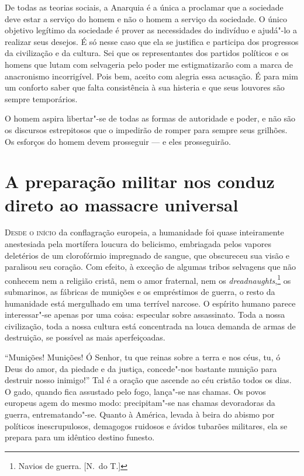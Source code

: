De todas as teorias sociais, a Anarquia é a única a proclamar que a
sociedade deve estar a serviço do homem e não o homem a serviço da
sociedade. O único objetivo legítimo da sociedade é prover as
necessidades do indivíduo e ajudá"-lo a realizar seus desejos. É só
nesse caso que ela se justifica e participa dos progressos da
civilização e da cultura. Sei que os representantes dos partidos
políticos e os homens que lutam com selvageria pelo poder me
estigmatizarão com a marca de anacronismo incorrigível. Pois bem,
aceito com alegria essa acusação. É para mim um conforto saber que
falta consistência à sua histeria e que seus louvores são sempre
temporários.

O homem aspira libertar"-se de todas as formas de autoridade e poder,
e não são os discursos estrepitosos que o impedirão de romper para
sempre seus grilhões. Os esforços do homem devem prosseguir --- e eles
prosseguirão.

\chapter{A preparação militar nos conduz direto ao massacre universal}


\textsc{Desde o início} da conflagração europeia, a humanidade foi quase
inteiramente anestesiada pela mortífera loucura do belicismo,
embriagada pelos vapores deletérios de um clorofórmio impregnado de
sangue, que obscureceu sua visão e paralisou seu coração. Com efeito, à
exceção de algumas tribos selvagens que não conhecem nem a religião
cristã, nem o amor fraternal, nem os \textit{dreadnaughts},\footnote{ 
Navios de guerra. [N.~do T.]}
os submarinos, as fábricas de munições e os empréstimos
de guerra, o resto da humanidade está mergulhado em uma terrível
narcose. O espírito humano parece interessar"-se apenas por uma coisa:
especular sobre assassinato. Toda a nossa civilização, toda a nossa
cultura está concentrada na louca demanda de armas de destruição, se
possível as mais aperfeiçoadas.

“Munições! Munições! Ó Senhor, tu que reinas sobre a terra e nos céus,
tu, ó Deus do amor, da piedade e da justiça, concede"-nos bastante
munição para destruir nosso inimigo!” Tal é a oração que ascende ao céu
cristão todos os dias. O gado, quando fica assustado pelo fogo,
lança"-se nas chamas. Os povos europeus agem do mesmo modo:
precipitam"-se nas chamas devoradoras da guerra, entrematando"-se.
Quanto à América, levada à beira do abismo por políticos
inescrupulosos, demagogos ruidosos e ávidos tubarões militares, ela se
prepara para um idêntico destino funesto.

